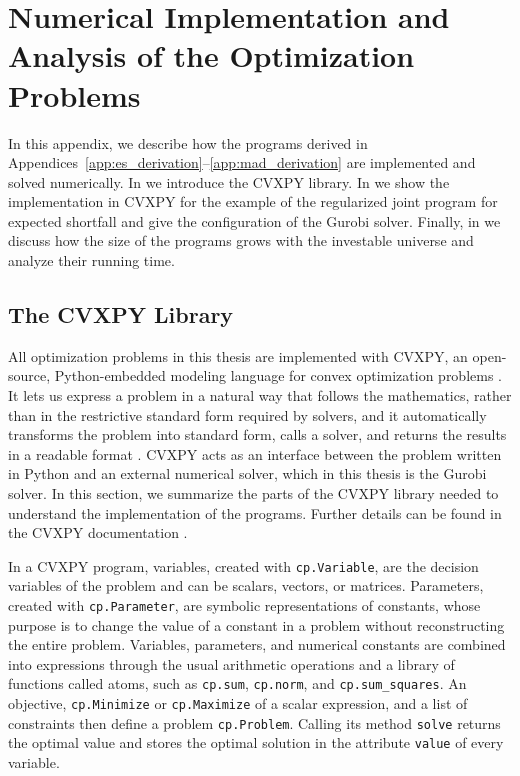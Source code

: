 \chapter{Numerical Implementation and Analysis of the Optimization Problems} \label{app:optimization-implementation}

In this appendix, we describe how the programs derived in Appendices~\ref{app:es_derivation}--\ref{app:mad_derivation}
are implemented and solved numerically. In  we
introduce the CVXPY library. In
 we show the implementation in CVXPY for the example of the regularized joint program
for expected shortfall and give the configuration
of the Gurobi solver. Finally, in  we discuss how the size of the programs grows
with the investable universe and analyze their running time.

\section{The CVXPY Library}\label{sec:cvxpy}

All optimization problems in this thesis are implemented with CVXPY, an open-source, Python-embedded modeling language
for convex optimization problems \cite{DiamondBoyd2016}. It lets us express a problem in a natural way that
follows the mathematics, rather than in the restrictive standard form required by solvers, and it automatically
transforms the problem into standard form, calls a solver, and returns the results in a readable format \cite{CVXPYDocs}. CVXPY 
acts as an interface between the problem written in Python and an external numerical
solver, which in this thesis is the Gurobi solver. In this section, we summarize the parts of
the CVXPY library needed to understand the implementation of the programs. Further details can be found in the CVXPY documentation \cite{CVXPYDocs}.

In a CVXPY program, variables, created with
\texttt{cp.Variable}, are the decision variables of the problem and can be scalars, vectors, or matrices. Parameters,
created with \texttt{cp.Parameter}, are symbolic representations of constants, whose purpose is to change the value of a
constant in a problem without reconstructing the entire problem. Variables, parameters, and numerical constants are combined into
expressions through the usual arithmetic operations and a
library of functions called atoms, such as \texttt{cp.sum}, \texttt{cp.norm}, and \texttt{cp.sum\_squares}. 
An objective, \texttt{cp.Minimize} or \texttt{cp.Maximize} of a scalar expression, and a list of
constraints then define a problem \texttt{cp.Problem}. Calling its method \texttt{solve} returns the optimal value and stores
the optimal solution in the attribute \texttt{value} of every variable.

